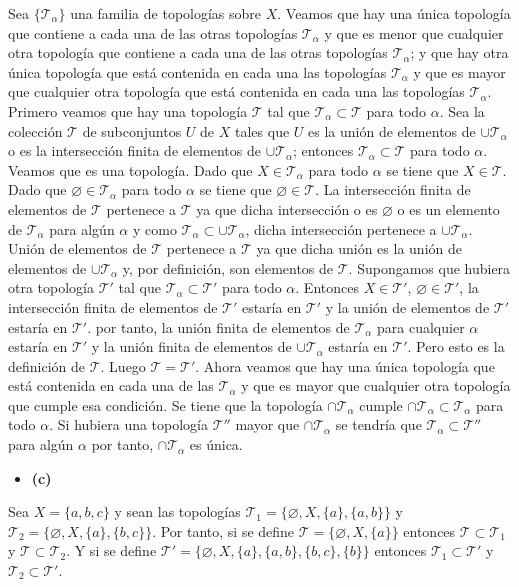 \documentclass{article}
\begin{document}
Sea $\{\mathcal{T}_{\alpha}\}$ una familia de topologías sobre $X$. Veamos que hay una única topología que contiene a cada una de las otras topologías $\mathcal{T}_{\alpha}$ y que es menor que cualquier otra topología que contiene a cada una de las otras topologías $\mathcal{T}_{\alpha}$; y que hay otra única topología que está contenida en cada una las topologías $\mathcal{T}_{\alpha}$ y que es mayor que cualquier otra topología que está contenida en cada una las topologías $\mathcal{T}_{\alpha}$. Primero veamos que hay una topología $\mathcal{T}$ tal que $\mathcal{T}_{\alpha}\subset \mathcal{T}$ para todo $\alpha$. Sea la colección $\mathcal{T}$ de subconjuntos $U$ de $X$ tales que $U$ es la unión de elementos de $\cup \mathcal{T}_\alpha$ o es la intersección finita de elementos de $\cup \mathcal{T}_\alpha$; entonces $\mathcal{T}_{\alpha}\subset\mathcal{T}$ para todo $\alpha$. Veamos que es una topología. Dado que $X\in \mathcal{T}_{\alpha}$ para todo $\alpha$ se tiene que $X\in \mathcal{T}$. Dado que $\varnothing\in \mathcal{T}_{\alpha}$ para todo $\alpha$ se tiene que $\varnothing\in \mathcal{T}$. La intersección finita de elementos de $\mathcal{T}$ pertenece a $\mathcal{T}$ ya que dicha intersección o es $\varnothing$ o  es un elemento de $\mathcal{T}_{\alpha}$ para algún $\alpha$ y como $\mathcal{T}_{\alpha}\subset \cup \mathcal{T}_{\alpha}$, dicha intersección pertenece a $\cup \mathcal{T}_{\alpha}$. Unión de elementos de $\mathcal{T}$ pertenece a $\mathcal{T}$ ya que  dicha unión es la unión de elementos de $ \cup \mathcal{T}_{\alpha}$ y, por definición, son elementos de $\mathcal{T}$. Supongamos que hubiera otra topología $\mathcal{T}'$ tal que $\mathcal{T}_{\alpha}\subset \mathcal{T}'$ para todo $\alpha$. Entonces $X\in \mathcal{T}'$, $\varnothing \in \mathcal{T}'$, la intersección finita de elementos de $\mathcal{T}'$ estaría en $\mathcal{T}'$ y la unión de elementos de $\mathcal{T}'$ estaría en $\mathcal{T}'$. por tanto, la unión finita de elementos de $\mathcal{T}_{\alpha}$ para cualquier $\alpha$ estaría en $\mathcal{T}'$ y la unión finita de elementos de $\cup\mathcal{T}_{\alpha}$ estaría en $\mathcal{T}'$. Pero esto es la definición de $\mathcal{T}$. Luego $\mathcal{T}=\mathcal{T}'$. Ahora veamos que hay una única topología que está contenida en cada una de las $\mathcal{T}_{\alpha}$ y que es mayor que cualquier otra topología que cumple esa condición. Se tiene que la topología $\cap \mathcal{T}_{\alpha}$ cumple $\cap \mathcal{T}_{\alpha}\subset \mathcal{T}_{\alpha}$ para todo $\alpha$. Si hubiera una topología $\mathcal{T}''$ mayor que $\cap \mathcal{T}_{\alpha}$ se tendría que $\mathcal{T}_{\alpha}\subset \mathcal{T}''$ para algún $\alpha$ por tanto, $\cap \mathcal{T}_{\alpha}$ es única.
\begin{itemize}
\item \bf (c) \rm
\end{itemize}
Sea $X=\{a,b,c\}$ y sean las topologías
 $\mathcal{T}_1=\{\varnothing,X,\{a\},\{a,b\}\}$ y  $\mathcal{T}_2=\{\varnothing,X,\{a\},\{b,c\}\}$. Por tanto, si se define $\mathcal{T}=\{\varnothing,X,\{a\}\}$ entonces $\mathcal{T}\subset\mathcal{T}_1$ y $\mathcal{T}\subset\mathcal{T}_2$. Y si se define $\mathcal{T}'=\{\varnothing,X,\{a\},\{a,b\},\{b,c\},\{b\}\}$ entonces $\mathcal{T}_1\subset\mathcal{T}'$ y $\mathcal{T}_2\subset\mathcal{T}'$.
\end{document}
